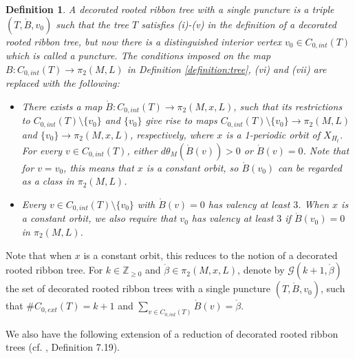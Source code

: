 \documentclass[a4paper]{article}
\newtheorem{definition}[theorem]{Definition}
\numberwithin{equation}{section}
\begin{document}
\begin{definition}
A decorated rooted ribbon tree with a single puncture is a triple $(T,\ring{B},v_0)$ such that the tree $T$ satisfies (i)-(v) in the definition of a decorated rooted ribbon tree, but now there is a distinguished interior vertex $v_0\in C_{0,\mathit{int}}(T)$ which is called a puncture. The conditions imposed on the map $B:C_{0,\mathit{int}}(T)\rightarrow\pi_2(M,L)$ in Definition \ref{definition:tree}, (vi) and (vii) are replaced with the following:
\begin{itemize}
	\item[(vi)'] There exists a map $\ring{B}:C_{0,\mathit{int}}(T)\rightarrow\pi_2(M,x,L)$, such that its restrictions to $C_{0,\mathit{int}}(T)\setminus\{v_0\}$ and $\{v_0\}$ give rise to maps $C_{0,\mathit{int}}(T)\setminus\{v_0\}\rightarrow\pi_2(M,L)$ and $\{v_0\}\rightarrow\pi_2(M,x,L)$, respectively, where $x$ is a 1-periodic orbit of $X_{H_t}$. For every $v\in C_{0,\mathit{int}}(T)$, either $d\theta_M\left(\ring{B}(v)\right)>0$ or $\ring{B}(v)=0$. Note that for $v=v_0$, this means that $x$ is a constant orbit, so $\ring{B}(v_0)$ can be regarded as a class in $\pi_2(M,L)$.
	\item[(vii)'] Every $v\in C_{0,\mathit{int}}(T)\setminus\{v_0\}$ with $\ring{B}(v)=0$ has valency at least $3$. When $x$ is a constant orbit, we also require that $v_0$ has valency at least $3$ if $\ring{B}(v_0)=0$ in $\pi_2(M,L)$.
\end{itemize}

\end{definition}

Note that when $x$ is a constant orbit, this reduces to the notion of a decorated rooted ribbon tree. For $k\in\mathbb{Z}_{\geq0}$ and $\ring{\beta}\in\pi_2(M,x,L)$, denote by $\mathcal{G}(k+1,\ring{\beta})$ the set of decorated rooted ribbon trees with a single puncture $(T,\ring{B},v_0)$, such that $\#C_{0,\mathit{ext}}(T)=k+1$ and $\sum_{v\in C_{0,\mathit{int}}(T)}\ring{B}(v)=\ring{\beta}$.

We also have the following extension of a reduction of decorated rooted ribbon trees (cf. \cite{ki2}, Definition 7.19).
\end{document}
